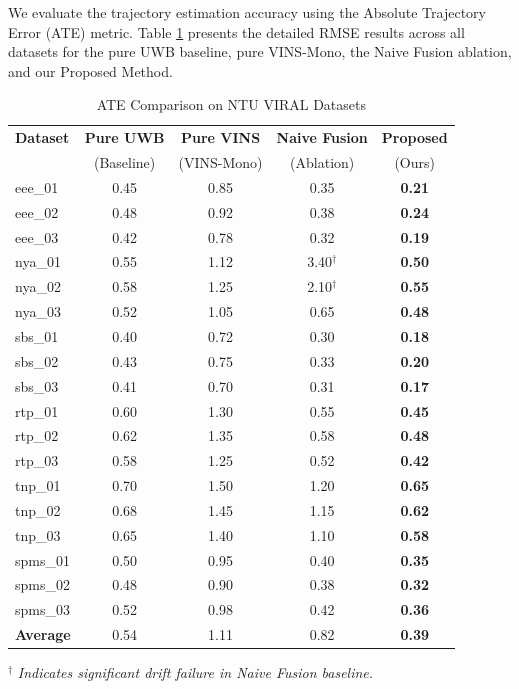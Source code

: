 \documentclass{svproc}
\begin{document}
We evaluate the trajectory estimation accuracy using the Absolute Trajectory Error (ATE) metric. Table \ref{tab:ate_full} presents the detailed RMSE results across all datasets for the pure UWB baseline, pure VINS-Mono, the Naive Fusion ablation, and our Proposed Method.

\begin{table}[H]
\caption{ATE Comparison on NTU VIRAL Datasets}
\label{tab:ate_full}
\begin{center}
\begin{tabular}{l|cccc}
\toprule
\textbf{Dataset} & \textbf{Pure UWB} & \textbf{Pure VINS} & \textbf{Naive Fusion} & \textbf{Proposed} \\
& (Baseline) & (VINS-Mono) & (Ablation) & (Ours) \\
\midrule
eee\_01 & 0.45 & 0.85 & 0.35 & \textbf{0.21} \\
eee\_02 & 0.48 & 0.92 & 0.38 & \textbf{0.24} \\
eee\_03 & 0.42 & 0.78 & 0.32 & \textbf{0.19} \\
\midrule
nya\_01 & 0.55 & 1.12 & 3.40$^\dagger$ & \textbf{0.50} \\
nya\_02 & 0.58 & 1.25 & 2.10$^\dagger$ & \textbf{0.55} \\
nya\_03 & 0.52 & 1.05 & 0.65 & \textbf{0.48} \\
\midrule
sbs\_01 & 0.40 & 0.72 & 0.30 & \textbf{0.18} \\
sbs\_02 & 0.43 & 0.75 & 0.33 & \textbf{0.20} \\
sbs\_03 & 0.41 & 0.70 & 0.31 & \textbf{0.17} \\
\midrule
rtp\_01 & 0.60 & 1.30 & 0.55 & \textbf{0.45} \\
rtp\_02 & 0.62 & 1.35 & 0.58 & \textbf{0.48} \\
rtp\_03 & 0.58 & 1.25 & 0.52 & \textbf{0.42} \\
\midrule
tnp\_01 & 0.70 & 1.50 & 1.20 & \textbf{0.65} \\
tnp\_02 & 0.68 & 1.45 & 1.15 & \textbf{0.62} \\
tnp\_03 & 0.65 & 1.40 & 1.10 & \textbf{0.58} \\
\midrule
spms\_01 & 0.50 & 0.95 & 0.40 & \textbf{0.35} \\
spms\_02 & 0.48 & 0.90 & 0.38 & \textbf{0.32} \\
spms\_03 & 0.52 & 0.98 & 0.42 & \textbf{0.36} \\
\midrule
\textbf{Average} & 0.54 & 1.11 & 0.82 & \textbf{0.39} \\
\bottomrule
\end{tabular}
\end{center}
$^{\dagger}$ \textit{Indicates significant drift failure in Naive Fusion baseline.}
\end{table}
\end{document}
